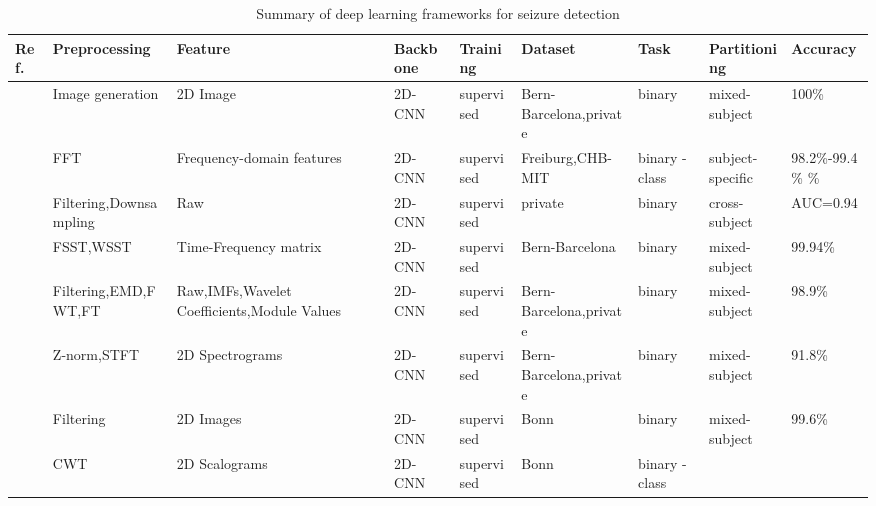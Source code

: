 

\begin{table*}[h]
\renewcommand{\arraystretch}{1.2}
\caption{Summary of deep learning frameworks for seizure detection}
\label{tab:seizures}
\footnotesize
\begin{tabular}{p{0.4cm}p{2.8cm}p{2cm}p{1.5cm}p{1.9cm}p{1.9cm}p{0.8cm}p{1.8cm}p{1.5cm}}
\hline
\textbf{Ref.} & \textbf{Preprocessing} & \textbf{Feature} & \textbf{Backbone} & \textbf{Training} & \textbf{Dataset} & \textbf{Task} & \textbf{Partitioning} & \textbf{Accuracy} \\
\hline
~\cite{Seizure1} & Image generation & 2D Image & 2D-CNN & supervised & Bern-Barcelona,\newline private  & binary & mixed-subject & 100\% \\
~\cite{zhou2018epileptic} & FFT & Frequency-domain features & 2D-CNN & supervised & Freiburg,\newline CHB-MIT & binary \newline 
3-class & subject-specific & 98.2\%-99.4\% \newline
95.3\% \\
~\cite{Seizure3} & Filtering,Downsampling & Raw & 2D-CNN & supervised & private & binary & cross-subject & AUC=0.94 \\
~\cite{Seizure4} & FSST,WSST & Time-Frequency matrix & 2D-CNN & supervised & Bern-Barcelona & binary & mixed-subject & 99.94\% \\
~\cite{Seizure5} & Filtering,EMD,FWT,FT & Raw,IMFs,\newline Wavelet Coefficients,\newline Module Values & 2D-CNN & supervised & Bern-Barcelona,\newline private  & binary & mixed-subject & 98.9\% \\
~\cite{Seizure6} & Z-norm,STFT & 2D Spectrograms & 2D-CNN & supervised & Bern-Barcelona,\newline private  & binary & mixed-subject & 91.8\% \\
~\cite{Seizure7} & Filtering & 2D Images & 2D-CNN & supervised & Bonn & binary & mixed-subject & 99.6\% \\
~\cite{turk2019epilepsy} & CWT & 2D Scalograms & 2D-CNN & supervised & Bonn & binary \newline 3-class \newline

\end{tabular}
\end{table*}
